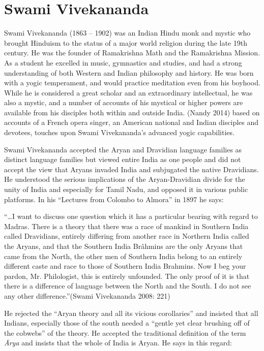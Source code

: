 \section*{Swami Vivekananda}

Swami Vivekananda (1863 – 1902) was an Indian Hindu monk and mystic who brought Hinduism to the status of a major world religion during the late 19th century. He was the founder of Ramakrishna Math and the Ramakrishna Mission. As a student he excelled in music, gymnastics and studies, and had a strong understanding of both Western and Indian philosophy and history. He was born with a yogic temperament, and would practice meditation even from his boyhood. While he is considered a great scholar and an extraordinary intellectual, he was also a mystic, and a number of accounts of his mystical or higher powers are available from his disciples both within and outside India. (Nandy 2014) based on accounts of a French opera singer, an American national and Indian disciples and devotees, touches upon Swami Vivekananda’s advanced yogic capabilities.

Swami Vivekananda accepted the Aryan and Dravidian language families as distinct language families but viewed entire India as one people and did not accept the view that Aryans invaded India and subjugated the native Dravidians. He understood the serious implications of the Aryan-Dravidian divide for the unity of India and especially for Tamil Nadu, and opposed it in various public platforms. In his “Lectures from Colombo to Almora” in 1897 he says:

\begin{myquote}
“…I want to discuss one question which it has a particular bearing with regard to Madras. There is a theory that there was a race of mankind in Southern India called Dravidians, entirely differing from another race in Northern India called the Aryans, and that the Southern India Brâhmins are the only Aryans that came from the North, the other men of Southern India belong to an entirely different caste and race to those of Southern India Brahmins. Now I beg your pardon, Mr. Philologist, this is entirely unfounded. The only proof of it is that there is a difference of language between the North and the South. I do not see any other difference.”(Swami Vivekananda 2008: 221)
\end{myquote}

He rejected the “Aryan theory and all its vicious corollaries” and insisted that all Indians, especially those of the south needed a “gentle yet clear brushing off of the cobwebs” of the theory. He accepted the traditional definition of the term \textit{Ārya} and insists that the whole of India is Aryan. He says in this regard:

